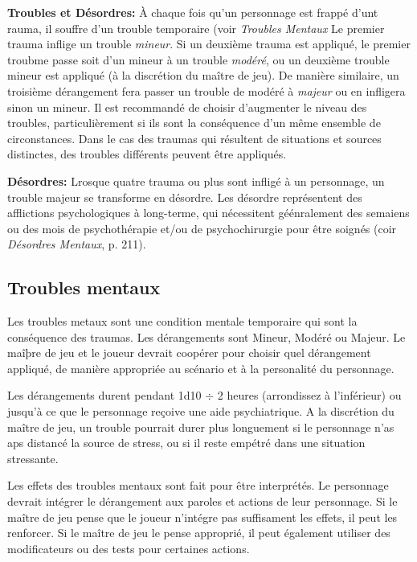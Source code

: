 \textbf{Troubles et Désordres:} À chaque fois qu'un personnage est frappé d'unt rauma, il souffre d'un trouble temporaire (voir \emph{Troubles Mentaux} Le premier trauma inflige un trouble \emph{mineur}. Si un deuxième trauma est appliqué, le premier troubme passe soit d'un mineur à un trouble \emph{modéré}, ou un deuxième trouble mineur est appliqué (à la discrétion du maître de jeu). De manière similaire, un troisième dérangement fera passer un trouble de modéré à \emph{majeur} ou en infligera sinon un mineur. Il est recommandé de choisir d'augmenter le niveau des troubles, particulièrement si ils sont la conséquence d'un même ensemble de circonstances. Dans le cas des traumas qui résultent de situations et sources distinctes, des troubles différents peuvent être appliqués. 

\textbf{Désordres:} Lrosque quatre trauma ou plus sont infligé à un personnage, un trouble majeur se transforme en désordre. Les désordre représentent des afflictions psychologiques à long-terme, qui nécessitent géénralement des semaiens ou des mois de psychothérapie et/ou de psychochirurgie pour être soignés (coir \emph{Désordres Mentaux}, p. 211). 

\subsection {Troubles mentaux} \label{sec:derangements} 

Les troubles metaux sont une condition mentale temporaire qui sont la conséquence des traumas. Les dérangements sont Mineur, Modéré ou Majeur. Le maîþre de jeu et le joueur devrait coopérer pour choisir quel dérangement appliqué, de manière appropriée au scénario et à la personalité du personnage. 

Les dérangements durent pendant 1d10 $\div$ 2 heures (arrondissez à l'inférieur) ou jusqu'à ce que le personnage reçoive une aide psychiatrique. A la discrétion du maître de jeu, un trouble pourrait durer plus longuement si le personnage n'as aps distancé la source de stress, ou si il reste empétré dans une situation stressante. 

Les effets des troubles mentaux sont fait pour être interprétés. Le personnage devrait intégrer le dérangement aux paroles et actions de leur personnage. Si le maître de jeu pense que le joueur n'intégre pas suffisament les effets, il peut les renforcer. Si le maître de jeu le pense approprié, il peut également utiliser des modificateurs ou des tests pour certaines actions. 

